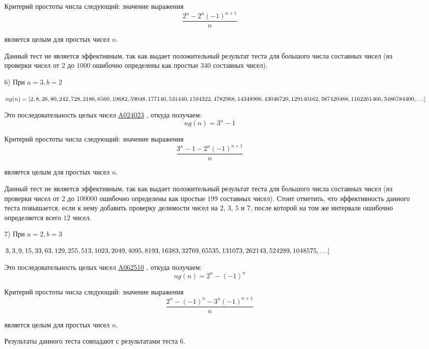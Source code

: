 \documentclass[
russian,
cp1251,
14pt,
simple
]{eskdtext}
\theoremstyle{definition}
\begin{document}
\begin{itemize}
Критерий простоты числа следующий: значение выражения
$$
\frac{2^n - 2^n(-1)^{n + 1}}{n}
$$

является целым для простых чисел $n$.

Данный тест не является эффективным, так как выдает положительный результат теста для большого числа составных чисел (из проверки чисел от $2$ до $1000$ ошибочно определены как простые $340$ составных чисел).

\item[6)] При $a=3, b=2$

\begin{math}
ng(n)=[2,8,26,80,242,728,2186,6560,19682,59048,177146,531440,\\
1594322,4782968,14348906,43046720,129140162,387420488,1162261466,\\
3486784400,\ldots]
\end{math}

Это последовательность целых чисел \href{http://oeis.org/A024023}{A024023} \cite{oeis}, откуда получаем:
$$
ng(n)=3^n - 1
$$

Критерий простоты числа следующий: значение выражения
$$
\frac{3^n - 1 - 2^n(-1)^{n + 1}}{n}
$$

является целым для простых чисел $n$.

Данный тест не является эффективным, так как выдает положительный результат теста для большого числа составных чисел (из проверки чисел от $2$ до $100000$ ошибочно определены как простые $199$ составных чисел). Стоит отметить, что эффективность данного теста повышается, если к нему добавить проверку делимости чисел на $2$, $3$, $5$ и $7$, после которой на том же интервале ошибочно определяется всего $12$ чисел.

\item[7)] При $a=2, b=3$

\begin{math}
3,3,9,15,33,63,129,255,513,1023,2049,4095,8193,16383,32769,\\
65535,131073,262143,524289,1048575,\ldots]
\end{math}

Это последовательность целых чисел \href{http://oeis.org/A062510}{A062510} \cite{oeis}, откуда получаем:
$$
ng(n)=2^n - (-1)^n
$$

Критерий простоты числа следующий: значение выражения
$$
\frac{2^n - (-1)^n - 3^n(-1)^{n + 1}}{n}
$$

является целым для простых чисел $n$.

Результаты данного теста совпадают с результатами теста 6.


\end{itemize}
\end{document}
